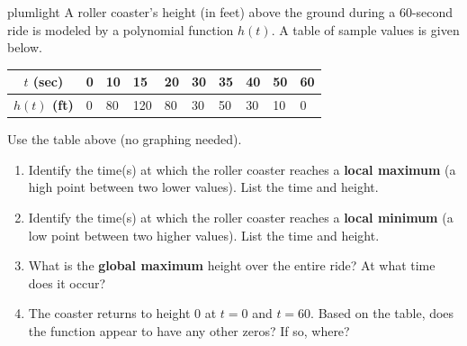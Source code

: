\documentclass[10pt]{article}
\begin{document}
\namepartnerperiod

\vspace{0.10in}

\begin{scenariobox}{plumlight}
A roller coaster's height (in feet) above the ground during a 60-second ride is modeled
by a polynomial function $h(t)$. A table of sample values is given below.

\vspace{6pt}
\renewcommand{\arraystretch}{1.4}
\begin{tabularx}{\linewidth}{@{} >{\bfseries}c *{9}{X} @{}}
\rowcolor{sky}
$t$ (sec) & 0 & 10 & 15 & 20 & 30 & 35 & 40 & 50 & 60 \\
\midrule
$h(t)$ (ft) & 0 & 80 & 120 & 80 & 30 & 50 & 30 & 10 & 0 \\
\end{tabularx}
\end{scenariobox}

\vspace{0.10in}

\begin{tcolorbox}[colback=white, colframe=black!40,
    title=\textbf{Tier R --- Remediate: Reading Key Features from a Table},
    fonttitle=\bfseries, arc=2mm, left=3mm, right=3mm, top=2mm, bottom=2mm]

Use the table above (no graphing needed).

\begin{enumerate}[leftmargin=1.5em, itemsep=8pt]
    \item Identify the time(s) at which the roller coaster reaches a \textbf{local maximum}
    (a high point between two lower values). List the time and height.

    \vspace{4pt}
    \blank{10cm}

    \item Identify the time(s) at which the roller coaster reaches a \textbf{local minimum}
    (a low point between two higher values). List the time and height.

    \vspace{4pt}
    \blank{10cm}

    \item What is the \textbf{global maximum} height over the entire ride?
    At what time does it occur?

    \vspace{4pt}
    \blank{10cm}

    \item The coaster returns to height 0 at $t = 0$ and $t = 60$.
    Based on the table, does the function appear to have any other zeros? If so, where?

    \vspace{4pt}
    \blank{10cm}
\end{enumerate}
\end{tcolorbox}
\end{document}
